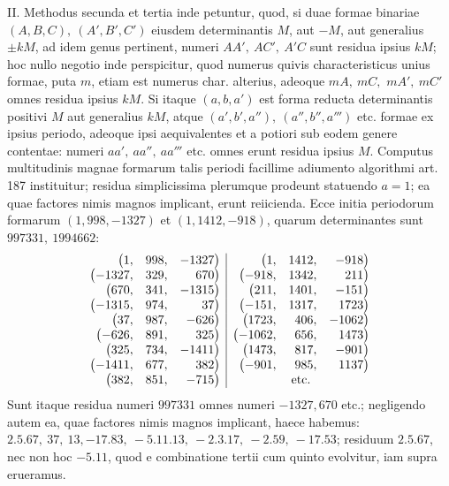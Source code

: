 II. Methodus secunda et tertia inde petuntur, quod, si duae formae binariae \((A,\allowbreak B,\allowbreak C),\allowbreak \ (A',\allowbreak B',\allowbreak C')\) eiusdem determinantis \(M\), aut \(-M\), aut generalius \(\pm kM\), ad idem genus pertinent, numeri \(AA',\allowbreak \ AC',\allowbreak \ A'C\) sunt residua ipsius \(kM\); hoc nullo negotio inde perspicitur, quod numerus quivis characteristicus unius formae, puta \(m\), etiam est numerus char. alterius, adeoque \(mA,\allowbreak \ mC,\allowbreak \)
\(mA',\allowbreak \ mC'\) omnes residua ipsius \(kM\). Si itaque \((a,\allowbreak b,\allowbreak a')\) est forma reducta determinantis positivi \(M\) aut generalius \(kM\), atque \((a',\allowbreak b',\allowbreak a''),\allowbreak \ (a'',\allowbreak b'',\allowbreak a''')\) etc. formae ex ipsius periodo, adeoque ipsi aequivalentes et a potiori sub eodem genere contentae: numeri \(aa',\allowbreak \ aa'',\allowbreak \ aa'''\) etc. omnes erunt residua ipsius \(M\). Computus multitudinis magnae formarum talis periodi facillime adiumento algorithmi art. 187 instituitur; residua simplicissima plerumque prodeunt statuendo \(a=1\); ea quae factores nimis magnos implicant, erunt reiicienda. Ecce initia periodorum formarum \((1,\allowbreak 998,\allowbreak -1327)\) et \((1,\allowbreak 1412,\allowbreak -918)\), quarum determinantes sunt \(997331,\allowbreak \ 1994662\): \[\begin{array}{rrr|rrr}\bigl(1,&998,&-1327\bigr)&\bigl(1,&1412,&-918\bigr)\\ \bigl(-1327,&329,&670\bigr)&\bigl(-918,&1342,&211\bigr)\\ \bigl(670,&341,&-1315\bigr)&\bigl(211,&1401,&-151\bigr)\\ \bigl(-1315,&974,&37\bigr)&\bigl(-151,&1317,&1723\bigr)\\ \bigl(37,&987,&-626\bigr)&\bigl(1723,&406,&-1062\bigr)\\ \bigl(-626,&891,&325\bigr)&\bigl(-1062,&656,&1473\bigr)\\ \bigl(325,&734,&-1411\bigr)&\bigl(1473,&817,&-901\bigr)\\ \bigl(-1411,&677,&382\bigr)&\bigl(-901,&985,&1137\bigr)\\ \bigl(382,&851,&-715\bigr)&\multicolumn{3}{c}{\mathrm{etc.}}\end{array}\] Sunt itaque residua numeri \(997331\) omnes numeri \(-1327,\allowbreak 670\) etc.; negligendo autem ea, quae factores nimis magnos implicant, haece habemus: \(2.5.67,\allowbreak \ 37,\allowbreak \ 13,\allowbreak -17.83,\allowbreak \ -5.11.13,\allowbreak \ -2.3.17,\allowbreak \ -2.59,\allowbreak \ -17.53\); residuum \(2.5.67\), nec non hoc \(-5.11\), quod e combinatione tertii cum quinto evolvitur, iam supra erueramus.

